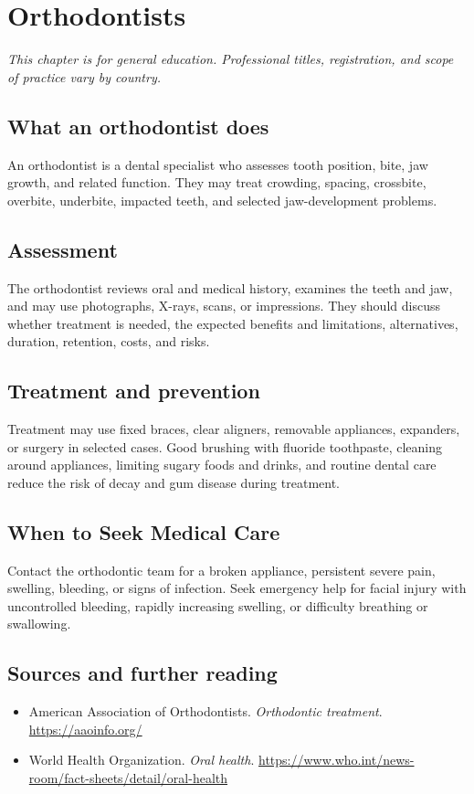 \chapter{Orthodontists}

\medskip
\noindent\textit{This chapter is for general education. Professional titles, registration, and scope of practice vary by country.}

\section*{What an orthodontist does}
An orthodontist is a dental specialist who assesses tooth position, bite, jaw growth, and related function. They may treat crowding, spacing, crossbite, overbite, underbite, impacted teeth, and selected jaw-development problems.

\section*{Assessment}
The orthodontist reviews oral and medical history, examines the teeth and jaw, and may use photographs, X-rays, scans, or impressions. They should discuss whether treatment is needed, the expected benefits and limitations, alternatives, duration, retention, costs, and risks.

\section*{Treatment and prevention}
Treatment may use fixed braces, clear aligners, removable appliances, expanders, or surgery in selected cases. Good brushing with fluoride toothpaste, cleaning around appliances, limiting sugary foods and drinks, and routine dental care reduce the risk of decay and gum disease during treatment.

\section*{When to Seek Medical Care}
Contact the orthodontic team for a broken appliance, persistent severe pain, swelling, bleeding, or signs of infection. Seek emergency help for facial injury with uncontrolled bleeding, rapidly increasing swelling, or difficulty breathing or swallowing.

\section*{Sources and further reading}
\begin{itemize}
\item American Association of Orthodontists. \textit{Orthodontic treatment}. \url{https://aaoinfo.org/}
\item World Health Organization. \textit{Oral health}. \url{https://www.who.int/news-room/fact-sheets/detail/oral-health}
\end{itemize}
